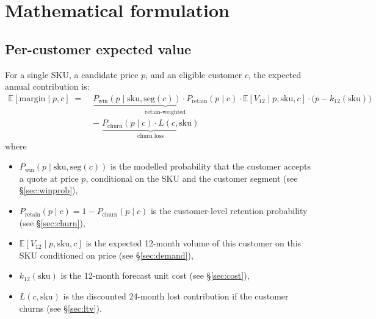 \documentclass[11pt,a4paper]{article}
\newcommand{\E}{\mathbb{E}}
\newcommand{\sku}{\mathrm{sku}}
\begin{document}
\section{Mathematical formulation}

\subsection{Per-customer expected value}
For a single SKU, a candidate price $p$, and an eligible customer $c$, the expected annual contribution is:
\begin{equation}
\label{eq:ev}
\begin{aligned}
\E[\text{margin} \mid p, c] \;=\;& \underbrace{P_{\text{win}}(p \mid \sku, \text{seg}(c)) \cdot P_{\text{retain}}(p \mid c)}_{\text{retain-weighted}} \cdot \E[V_{12} \mid p, \sku, c] \cdot \bigl(p - k_{12}(\sku)\bigr) \\
&-\; \underbrace{P_{\text{churn}}(p \mid c) \cdot L(c, \sku)}_{\text{churn loss}}
\end{aligned}
\end{equation}
where
\begin{itemize}[leftmargin=2em,itemsep=2pt]
  \item $P_{\text{win}}(p \mid \sku, \text{seg}(c))$ is the modelled probability that the customer accepts a quote at price $p$, conditional on the SKU and the customer segment (see §\ref{sec:winprob}),
  \item $P_{\text{retain}}(p \mid c) = 1 - P_{\text{churn}}(p \mid c)$ is the customer-level retention probability (see §\ref{sec:churn}),
  \item $\E[V_{12} \mid p, \sku, c]$ is the expected 12-month volume of this customer on this SKU conditioned on price (see §\ref{sec:demand}),
  \item $k_{12}(\sku)$ is the 12-month forecast unit cost (see §\ref{sec:cost}),
  \item $L(c, \sku)$ is the discounted 24-month lost contribution if the customer churns (see §\ref{sec:ltv}).
\end{itemize}
\end{document}
